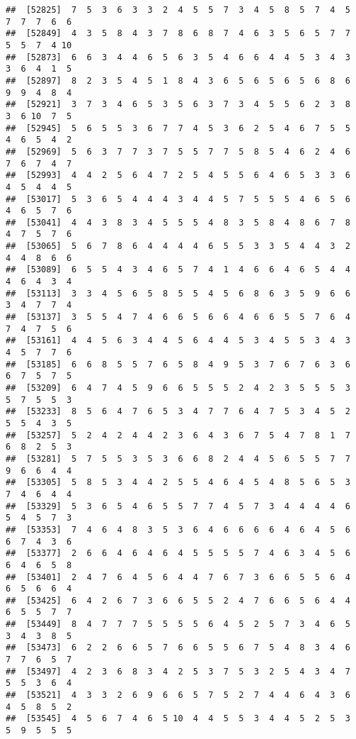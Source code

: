 \documentclass[
]{book}
\begin{document}
\begin{verbatim}
##  [52825]  7  5  3  6  3  3  2  4  5  5  7  3  4  5  8  5  7  4  5  7  7  7  6  6
##  [52849]  4  3  5  8  4  3  7  8  6  8  7  4  6  3  5  6  5  7  7  5  5  7  4 10
##  [52873]  6  6  3  4  4  6  5  6  3  5  4  6  6  4  4  5  3  4  3  3  6  4  1  5
##  [52897]  8  2  3  5  4  5  1  8  4  3  6  5  6  5  6  5  6  8  6  9  9  4  8  4
##  [52921]  3  7  3  4  6  5  3  5  6  3  7  3  4  5  5  6  2  3  8  3  6 10  7  5
##  [52945]  5  6  5  5  3  6  7  7  4  5  3  6  2  5  4  6  7  5  5  4  6  5  4  2
##  [52969]  5  6  3  7  7  3  7  5  5  7  7  5  8  5  4  6  2  4  6  7  6  7  4  7
##  [52993]  4  4  2  5  6  4  7  2  5  4  5  5  6  4  6  5  3  3  6  4  5  4  4  5
##  [53017]  5  3  6  5  4  4  4  3  4  4  5  7  5  5  5  4  6  5  6  4  6  5  7  6
##  [53041]  4  4  3  8  3  4  5  5  5  4  8  3  5  8  4  8  6  7  8  4  7  5  7  6
##  [53065]  5  6  7  8  6  4  4  4  4  6  5  5  3  3  5  4  4  3  2  4  4  8  6  6
##  [53089]  6  5  5  4  3  4  6  5  7  4  1  4  6  6  4  6  5  4  4  4  6  4  3  4
##  [53113]  3  3  4  5  6  5  8  5  5  4  5  6  8  6  3  5  9  6  6  3  4  7  7  4
##  [53137]  3  5  5  4  7  4  6  6  5  6  6  4  6  6  5  5  7  6  4  7  4  7  5  6
##  [53161]  4  4  5  6  3  4  4  5  6  4  4  5  3  4  5  5  3  4  3  4  5  7  7  6
##  [53185]  6  6  8  5  5  7  6  5  8  4  9  5  3  7  6  7  6  3  6  6  7  5  7  5
##  [53209]  6  4  7  4  5  9  6  6  5  5  5  2  4  2  3  5  5  5  3  5  7  5  5  3
##  [53233]  8  5  6  4  7  6  5  3  4  7  7  6  4  7  5  3  4  5  2  5  5  4  3  5
##  [53257]  5  2  4  2  4  4  2  3  6  4  3  6  7  5  4  7  8  1  7  6  8  2  5  3
##  [53281]  5  7  5  5  3  5  3  6  6  8  2  4  4  5  6  5  5  7  7  9  6  6  4  4
##  [53305]  5  8  5  3  4  4  2  5  5  4  6  4  5  4  8  5  6  5  3  7  4  6  4  4
##  [53329]  5  3  6  5  4  6  5  5  7  7  4  5  7  3  4  4  4  4  6  5  4  5  7  3
##  [53353]  7  4  6  4  8  3  5  3  6  4  6  6  6  6  4  6  4  5  6  6  7  4  3  6
##  [53377]  2  6  6  4  6  4  6  4  5  5  5  5  7  4  6  3  4  5  6  6  4  6  5  8
##  [53401]  2  4  7  6  4  5  6  4  4  7  6  7  3  6  6  5  5  6  4  6  5  6  6  4
##  [53425]  6  4  2  6  7  3  6  6  5  5  2  4  7  6  6  5  6  4  4  6  5  5  7  7
##  [53449]  8  4  7  7  7  5  5  5  5  6  4  5  2  5  7  3  4  6  5  3  4  3  8  5
##  [53473]  6  2  2  6  6  5  7  6  6  5  5  6  7  5  4  8  3  4  6  7  7  6  5  7
##  [53497]  4  2  3  6  8  3  4  2  5  3  7  5  3  2  5  4  3  4  7  5  5  3  6  4
##  [53521]  4  3  3  2  6  9  6  6  5  7  5  2  7  4  4  6  4  3  6  4  5  8  5  2
##  [53545]  4  5  6  7  4  6  5 10  4  4  5  5  3  4  4  5  2  5  3  5  9  5  5  5

\end{verbatim}
\end{document}
